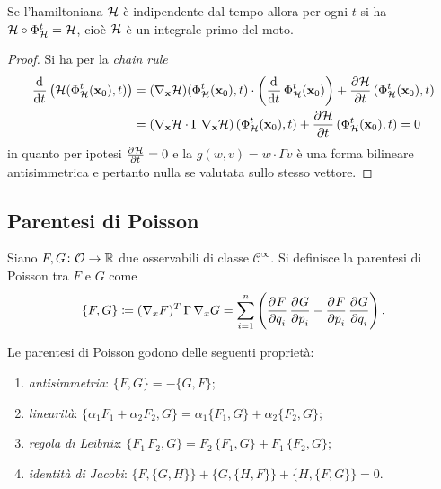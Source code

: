 \begin{thm}
    Se l'hamiltoniana $ \mathcal{H} $ è indipendente dal tempo allora per ogni $ t $ si ha $ \mathcal{H} \circ \Phi_{\mathcal{H}}^t = \mathcal{H} $, cioè $ \mathcal{H} $ è un integrale primo del moto.
\end{thm}
\begin{proof}
    Si ha per la \emph{chain rule}
    \begin{align*}
        \dod{}{t} \left(\ham(\Phi_\ham^t(\vec{x}_0), t)\right) & = (\nabla_\vec{x} \ham) (\Phi^t_\ham(\vec{x}_0), t) \cdot \left(\dod{}{t}\Phi^t_\ham(\vec{x}_0)\right) + \dpd{\ham}{t}(\Phi_\ham^t(\vec{x}_0), t) \\
        & = \left(\nabla_\vec{x} \ham \cdot \Gamma \, \nabla_\vec{x} \ham\right)(\Phi^t_\ham(\vec{x}_0), t) + \dpd{\ham}{t}(\Phi_\ham^t(\vec{x}_0), t) = 0
    \end{align*}
    in quanto per ipotesi $ \pd{\ham}{t} = 0 $ e la $ g(w, v) = w \cdot \Gamma v $ è una forma bilineare antisimmetrica e pertanto nulla se valutata sullo stesso vettore.
\end{proof}

\subsection{Parentesi di Poisson}
\begin{definition}
    Siano $ F, G \colon \mathcal{O} \to \mathbb{R} $ due osservabili di classe $ \mathcal{C}^\infty $. Si definisce la parentesi di Poisson tra $ F $ e $ G $ come
    \begin{equation}
        \left\{F, G\right\} \coloneqq (\nabla_x F)^T \,\Gamma\, \nabla_x G = \sum_{i=1}^{n} \left(\dpd{F}{q_i} \dpd{G}{p_i} - \dpd{F}{p_i}\dpd{G}{q_i}\right).
    \end{equation}
\end{definition}

\begin{proposition}
    Le parentesi di Poisson godono delle seguenti proprietà:
    \begin{enumerate}[label=(\roman*)]
        \item \emph{antisimmetria}: $ \{F, G\} = - \{G, F\} $;
        \item \emph{linearità}: $ \{\alpha_1 F_1 + \alpha_2 F_2, G\} = \alpha_1 \{F_1, G\} + \alpha_2\{F_2, G\} $;
        \item \emph{regola di Leibniz}: $ \{F_1 \, F_2, G\} = F_2 \, \{F_1, G\} + F_1 \, \{F_2, G\} $;
        \item \emph{identità di Jacobi}: $ \{F, \{G, H\}\} + \{G, \{H, F\}\} + \{H, \{F, G\}\} = 0 $.
    \end{enumerate}
\end{proposition}

